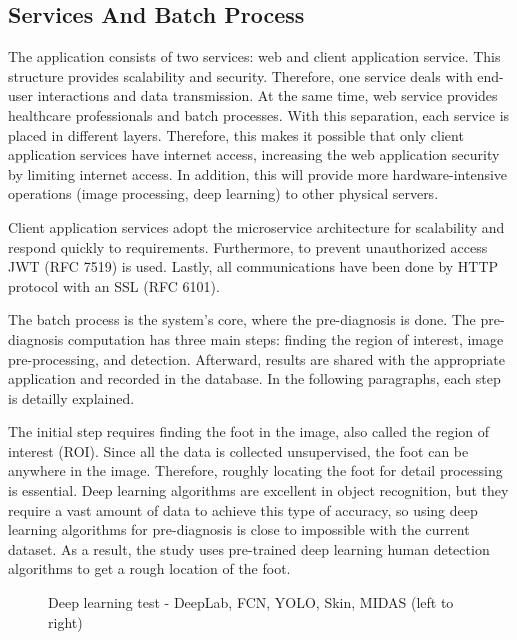 \subsection{Services And Batch Process} \label{sec:StudyIServicesAndBatchProcess}
The application consists of two services: web and client application service. This structure provides scalability and security. Therefore, one service deals with end-user interactions and data transmission. At the same time, web service provides healthcare professionals and batch processes. With this separation, each service is placed in different layers. Therefore, this makes it possible that only client application services have internet access, increasing the web application security by limiting internet access. In addition, this will provide more hardware-intensive operations (image processing, deep learning) to other physical servers. 

Client application services adopt the microservice architecture for scalability and respond quickly to requirements. Furthermore, to prevent unauthorized access JWT (RFC 7519) is used. Lastly, all communications have been done by HTTP protocol with an SSL (RFC 6101). 

The batch process is the system's core, where the pre-diagnosis is done. The pre-diagnosis computation has three main steps: finding the region of interest, image pre-processing, and detection. Afterward, results are shared with the appropriate application and recorded in the database. In the following paragraphs, each step is detailly explained.

The initial step requires finding the foot in the image, also called the region of interest (ROI). Since all the data is collected unsupervised, the foot can be anywhere in the image. Therefore, roughly locating the foot for detail processing is essential. Deep learning algorithms are excellent in object recognition, but they require a vast amount of data to achieve this type of accuracy, so using deep learning algorithms for pre-diagnosis is close to impossible with the current dataset. As a result, the study uses pre-trained deep learning human detection algorithms to get a rough location of the foot.

\begin{figure}[htbp]
\centering
{}
\caption{Deep learning test - DeepLab, FCN, YOLO, Skin, MIDAS (left to right)}
\label{fig:DeepLearningTest}
\end{figure}

